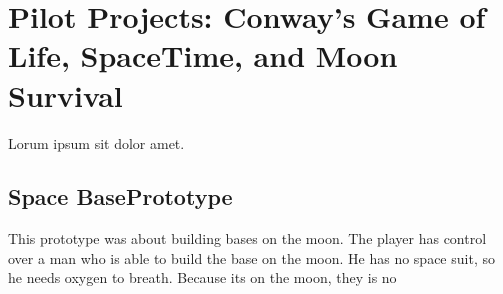 \section{Pilot Projects: Conway's Game of Life, SpaceTime, and Moon Survival}


Lorum ipsum sit dolor amet.  \lipsum[2-4]




\newcommand{\prototypeSiddall}{Space Base}

\subsection{\prototypeSiddall Prototype}
This prototype was about building bases on the moon.
The player has control over a man who is able to build the base on the moon.
He has no space suit, so he needs oxygen to breath.
Because its on the moon, they is no




